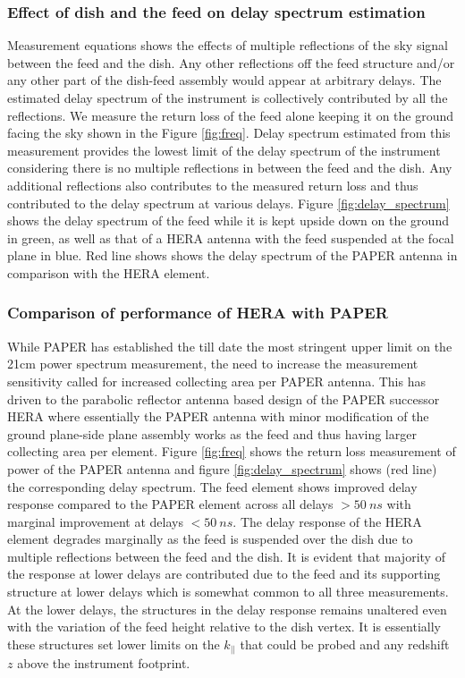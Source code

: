 \documentclass[twocolumn]{emulateapj}
\begin{document}
\subsubsection{Effect of dish and the feed on delay spectrum estimation}
Measurement equations shows the effects of multiple reflections of the sky signal between the feed and the dish. Any other reflections off the feed structure and/or any other part of the dish-feed assembly would appear at arbitrary delays. The estimated delay spectrum of the instrument is collectively contributed by all the reflections. We measure the return loss of the feed alone keeping it on the ground facing the sky shown in the Figure \ref{fig:freq}. Delay spectrum estimated from this measurement provides the lowest limit of the delay spectrum of the instrument considering there is no multiple reflections in between the feed and the dish. 
 Any additional reflections also contributes to the measured return loss and thus contributed to the delay spectrum at various delays. Figure \ref{fig:delay_spectrum} shows the delay spectrum of the feed while it is kept upside down on the ground in green, as well as that of a HERA antenna with the feed suspended at the focal plane in blue. Red line shows shows the delay spectrum of the PAPER antenna in comparison with the HERA element.
\subsubsection{Comparison of performance of HERA with PAPER}
While PAPER has established the till date the most stringent upper limit on the 21cm power spectrum measurement, the need to increase the measurement sensitivity called for increased collecting area per PAPER antenna. This has driven to the parabolic reflector antenna based design of the PAPER successor HERA where essentially the PAPER antenna with minor modification of the ground plane-side plane assembly works as the feed and thus having larger collecting area per element. Figure \ref{fig:freq} shows the return loss measurement of power of the PAPER antenna and figure \ref{fig:delay_spectrum} shows (red line) the corresponding delay spectrum. The feed element shows improved delay response compared to the PAPER element across all delays $>50~ns$ with marginal improvement at delays $<50~ns$. The delay response of the HERA element degrades marginally as the feed is suspended over the dish due to multiple reflections between the feed and the dish.  It is evident that majority of the response at lower delays are contributed due to the feed and its supporting structure at lower delays which is somewhat common to all three measurements. At the lower delays, the structures in the delay response remains unaltered even with the variation of the feed height relative to the dish vertex. It is essentially these structures set lower limits on the $k_{||}$ that could be probed and any redshift $z$ above the instrument footprint. 
\end{document}
